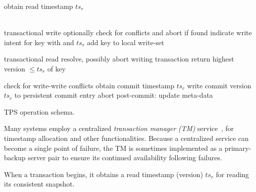 \begin{algorithm}[tb]
\begin{algorithmic}[1]
\small
{}
\State obtain read timestamp $ts_r$ 
\EndProcedure

\\ \Comment transactional write
\State optionally check for conflicts and abort if found 
\State indicate write intent for key with  and $ts_r$
\State add key to local write-set
\EndProcedure

 \Comment transactional read
	\State resolve, possibly abort writing transaction \label{l:resolve}
\EndIf
\State return highest version   $\le ts_r$ of key
\EndProcedure


\Statex \Comment check for write-write conflicts  \label{l:validate}
\State obtain commit timestamp $ts_c$
	\State write commit  version $ts_c$ to persistent commit entry \label{l:commit}
\Else
	\State abort	
\EndIf
\State post-commit: update meta-data
\EndProcedure

\end{algorithmic}
\caption{TPS operation schema.} 
\label{alg:schema}

\end{algorithm} 

Many systems employ a centralized \emph{transaction manager (TM)\/} service~\cite{Percolator2010,OmidICDE2014,Omid2017,tephra},
for timestamp allocation and other functionalities. 
 Because a centralized service can become a single point of failure, the TM is sometimes implemented
 as a primary-backup server pair to ensure its continued availability following failures.

  When a transaction begins, it obtains a read timestamp (version) $ts_r$ for reading its consistent snapshot.

